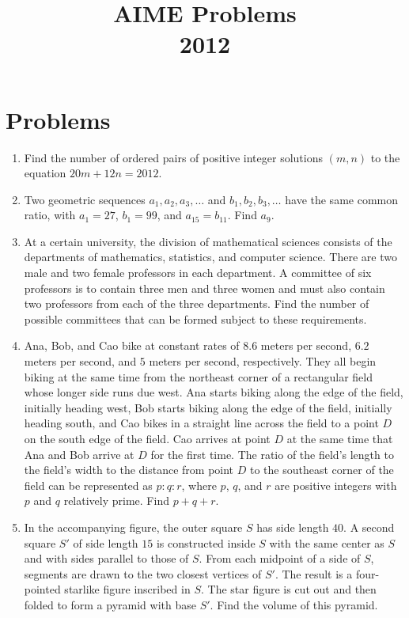 \documentclass{article}
\title{AIME Problems \\ 2012}
\date{}
\begin{document}
\maketitle\thispagestyle{fancy}\newpage\section*{Problems}\begin{enumerate}[label=\arabic*., itemsep=0.5em]\item Find the number of ordered pairs of positive integer solutions $(m, n)$ to the equation $20m + 12n = 2012$.\par \vspace{0.5em}\item Two geometric sequences $a_1, a_2, a_3, \ldots$ and $b_1, b_2, b_3, \ldots$ have the same common ratio, with $a_1 = 27$, $b_1=99$, and $a_{15}=b_{11}$. Find $a_9$.\par \vspace{0.5em}\item At a certain university, the division of mathematical sciences consists of the departments of mathematics, statistics, and computer science. There are two male and two female professors in each department. A committee of six professors is to contain three men and three women and must also contain two professors from each of the three departments. Find the number of possible committees that can be formed subject to these requirements.\par \vspace{0.5em}\item Ana, Bob, and Cao bike at constant rates of $8.6$ meters per second, $6.2$ meters per second, and $5$ meters per second, respectively. They all begin biking at the same time from the northeast corner of a rectangular field whose longer side runs due west. Ana starts biking along the edge of the field, initially heading west, Bob starts biking along the edge of the field, initially heading south, and Cao bikes in a straight line across the field to a point $D$ on the south edge of the field. Cao arrives at point $D$ at the same time that Ana and Bob arrive at $D$ for the first time. The ratio of the field's length to the field's width to the distance from point $D$ to the southeast corner of the field can be represented as $p : q : r$, where $p$, $q$, and $r$ are positive integers with $p$ and $q$ relatively prime. Find $p+q+r$.\par \vspace{0.5em}\item In the accompanying figure, the outer square $S$ has side length $40$. A second square $S'$ of side length $15$ is constructed inside $S$ with the same center as $S$ and with sides parallel to those of $S$. From each midpoint of a side of $S$, segments are drawn to the two closest vertices of $S'$. The result is a four-pointed starlike figure inscribed in $S$. The star figure is cut out and then folded to form a pyramid with base $S'$. Find the volume of this pyramid.


\end{enumerate}
\end{document}
